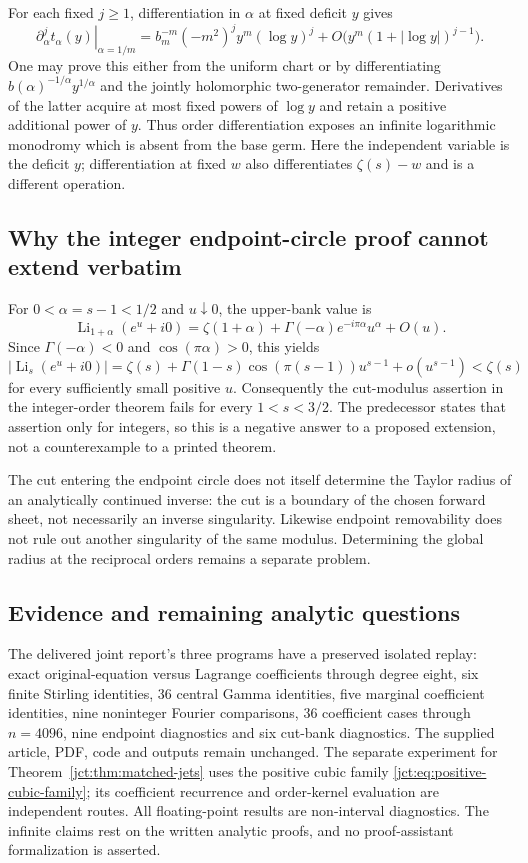 For each fixed $j\ge1$, differentiation in $\alpha$ at fixed deficit
$y$ gives
\[
 \left.\partial_\alpha^j t_\alpha(y)\right|_{\alpha=1/m}
 =b_m^{-m}(-m^2)^j y^m(\log y)^j
 +O\bigl(y^m(1+|\log y|)^{j-1}\bigr).
\]
One may prove this either from the uniform chart or by differentiating
$b(\alpha)^{-1/\alpha}y^{1/\alpha}$ and the jointly holomorphic
two-generator remainder.  Derivatives of the latter acquire at most
fixed powers of $\log y$ and retain a positive additional power of
$y$.  Thus order differentiation exposes an infinite logarithmic
monodromy which is absent from the base germ.
Here the independent variable is the deficit $y$; differentiation at
fixed $w$ also differentiates $\zeta(s)-w$ and is a different operation.

\subsection{Why the integer endpoint-circle proof cannot extend verbatim}

For $0<\alpha=s-1<1/2$ and $u\downarrow0$, the upper-bank value is
\[
 \operatorname{Li}_{1+\alpha}(e^u+i0)
 =\zeta(1+\alpha)+\Gamma(-\alpha)e^{-i\pi\alpha}u^\alpha+O(u).
\]
Since $\Gamma(-\alpha)<0$ and $\cos(\pi\alpha)>0$, this yields
\[
 |\operatorname{Li}_{s}(e^u+i0)|
 =\zeta(s)+\Gamma(1-s)\cos(\pi(s-1))u^{s-1}
 +o(u^{s-1})<\zeta(s)
\]
for every sufficiently small positive $u$.
Consequently the cut-modulus assertion in the integer-order theorem
fails for every $1<s<3/2$.  The predecessor states that assertion only
for integers, so this is a negative answer to a proposed extension,
not a counterexample to a printed theorem.

The cut entering the endpoint circle does not itself determine the
Taylor radius of an analytically continued inverse: the cut is a
boundary of the chosen forward sheet, not necessarily an inverse
singularity.  Likewise endpoint removability does not rule out another
singularity of the same modulus.  Determining the global radius at the
reciprocal orders remains a separate problem.

\subsection{Evidence and remaining analytic questions}

The delivered joint report's three programs have a preserved isolated
replay: exact original-equation versus Lagrange coefficients through
degree eight, six finite Stirling identities, 36 central Gamma identities,
five marginal coefficient identities, nine noninteger Fourier comparisons,
36 coefficient cases through $n=4096$, nine endpoint diagnostics and six
cut-bank diagnostics. The supplied article, PDF, code and outputs remain
unchanged. The separate experiment for Theorem~\ref{jct:thm:matched-jets}
uses the positive cubic family \eqref{jct:eq:positive-cubic-family}; its
coefficient recurrence and order-kernel evaluation are independent routes.
All floating-point results are non-interval diagnostics. The infinite
claims rest on the written analytic proofs, and no proof-assistant
formalization is asserted.

